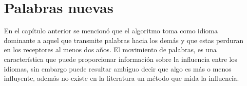 \chapter{Palabras nuevas}



En el capítulo anterior se mencionó que el algoritmo toma como  idioma
dominante a aquel que transmite palabras hacia los demás y que estas perduran en los receptores al menos dos años.  El movimiento de palabras, es una característica que puede proporcionar información sobre la influencia entre los idiomas, sin embargo  puede resultar ambiguo decir que algo es más o menos influyente, además  no existe en la literatura un método que mida la influencia.






% 
% 



 


 

